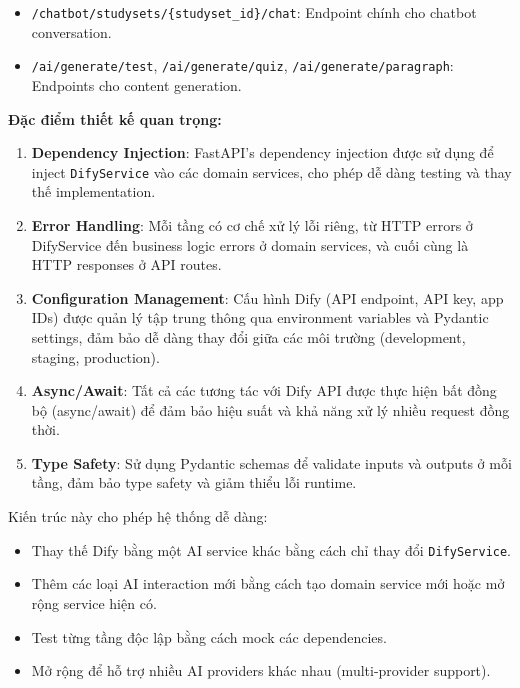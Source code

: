 \documentclass[../DoAn.tex]{subfiles}
\begin{document}
\begin{itemize}
    \item \texttt{/chatbot/studysets/\{studyset\_id\}/chat}: Endpoint chính cho chatbot conversation.
    \item \texttt{/ai/generate/test}, \texttt{/ai/generate/quiz}, \texttt{/ai/generate/paragraph}: Endpoints cho content generation.
\end{itemize}

\textbf{Đặc điểm thiết kế quan trọng:}

\begin{enumerate}
    \item \textbf{Dependency Injection}: FastAPI's dependency injection được sử dụng để inject \texttt{DifyService} vào các domain services, cho phép dễ dàng testing và thay thế implementation.
    
    \item \textbf{Error Handling}: Mỗi tầng có cơ chế xử lý lỗi riêng, từ HTTP errors ở DifyService đến business logic errors ở domain services, và cuối cùng là HTTP responses ở API routes.
    
    \item \textbf{Configuration Management}: Cấu hình Dify (API endpoint, API key, app IDs) được quản lý tập trung thông qua environment variables và Pydantic settings, đảm bảo dễ dàng thay đổi giữa các môi trường (development, staging, production).
    
    \item \textbf{Async/Await}: Tất cả các tương tác với Dify API được thực hiện bất đồng bộ (async/await) để đảm bảo hiệu suất và khả năng xử lý nhiều request đồng thời.
    
    \item \textbf{Type Safety}: Sử dụng Pydantic schemas để validate inputs và outputs ở mỗi tầng, đảm bảo type safety và giảm thiểu lỗi runtime.
\end{enumerate}

Kiến trúc này cho phép hệ thống dễ dàng:
\begin{itemize}
    \item Thay thế Dify bằng một AI service khác bằng cách chỉ thay đổi \texttt{DifyService}.
    \item Thêm các loại AI interaction mới bằng cách tạo domain service mới hoặc mở rộng service hiện có.
    \item Test từng tầng độc lập bằng cách mock các dependencies.
    \item Mở rộng để hỗ trợ nhiều AI providers khác nhau (multi-provider support).
\end{itemize}
\end{document}

